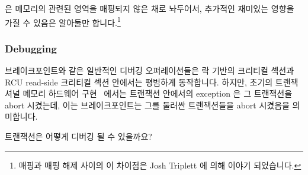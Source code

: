  은 메모리의 관련된 영역을 매핑되지 않은 채로 놔두어서, 추가적인
재미있는 영향을 가질 수 있음은 알아둘만 합니다.\footnote{
	매핑과 매핑 해제 사이의 이 차이점은 Josh Triplett 에 의해 이야기
	되었습니다.}

\subsubsection{Debugging}
\label{sec:future:Debugging}

브레이크포인트와 같은 일반적인 디버깅 오퍼레이션들은 락 기반의 크리티컬 섹션과
RCU read-side 크리티컬 섹션 안에서는 평범하게 동작합니다.
하지만, 초기의 트랜잭셔널 메모리 하드웨어 구현~\cite{DaveDice2009ASPLOSRockHTM}
에서는 트랜잭션 안에서의 exception 은 그 트랜잭션을 abort 시켰는데, 이는
브레이크포인트는 그를 둘러싼 트랜잭션들을 abort 시켰음을 의미합니다.

트랜잭션은 어떻게 디버깅 될 수 있을까요?

